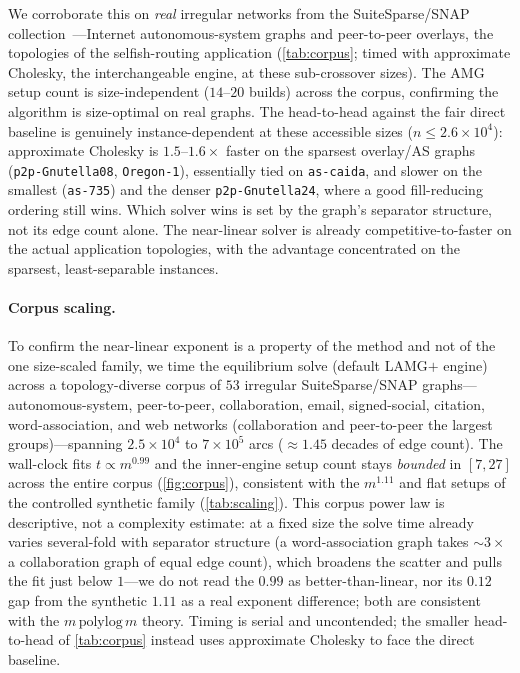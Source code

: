 \documentclass[ijoc]{informs3}
\begin{document}
We corroborate this on \emph{real} irregular networks from the SuiteSparse/SNAP collection~\citep{leskovec2007}---Internet
autonomous-system graphs and peer-to-peer overlays, the topologies of the selfish-routing application
(\cref{tab:corpus}; timed with approximate Cholesky, the interchangeable engine, at these sub-crossover sizes). The AMG setup count is size-independent ($14$--$20$ builds) across the corpus, confirming
the algorithm is size-optimal on real graphs. The head-to-head against the fair direct baseline is genuinely
instance-dependent at these accessible sizes ($n\le2.6\times10^4$): approximate Cholesky is $1.5$--$1.6\times$
faster on the sparsest overlay/AS graphs (\texttt{p2p-Gnutella08}, \texttt{Oregon-1}), essentially tied on
\texttt{as-caida}, and slower on the smallest (\texttt{as-735}) and the denser \texttt{p2p-Gnutella24}, where a
good fill-reducing ordering still wins. Which solver wins is set by the graph's separator structure, not its
edge count alone. The near-linear solver is already competitive-to-faster on the actual application
topologies, with the advantage concentrated on the sparsest, least-separable instances.

\paragraph{Corpus scaling.}
To confirm the near-linear exponent is a property of the method and not of the one size-scaled family, we time
the equilibrium solve (default LAMG$+$ engine) across a topology-diverse corpus of $53$ irregular
SuiteSparse/SNAP graphs---autonomous-system, peer-to-peer, collaboration, email, signed-social, citation,
word-association, and web networks (collaboration and peer-to-peer the largest groups)---spanning
$2.5\times10^4$ to $7\times10^5$ arcs (${\approx}1.45$ decades of edge count). The wall-clock fits
$t\propto m^{0.99}$ and the inner-engine setup count stays \emph{bounded} in $[7,27]$ across the entire corpus
(\cref{fig:corpus}), consistent with the $m^{1.11}$ and flat setups of the controlled synthetic family
(\cref{tab:scaling}). This corpus power law is descriptive, not a complexity estimate: at a fixed size the solve
time already varies several-fold with separator structure (a word-association graph takes ${\sim}3\times$ a
collaboration graph of equal edge count), which broadens the scatter and pulls the fit just below $1$---we do not
read the $0.99$ as better-than-linear, nor its $0.12$ gap from the synthetic $1.11$ as a real exponent
difference; both are consistent with the $m\,\mathrm{polylog}\,m$ theory. Timing is serial and uncontended; the
smaller head-to-head of \cref{tab:corpus} instead uses approximate Cholesky to face the direct baseline.
\end{document}
